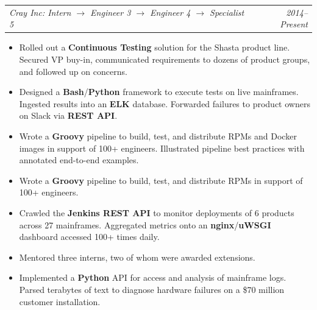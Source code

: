 \documentclass[12pt,letterpaper]{article}
\makeatletter
\newcommand{\headerpair}[2]{
    \begin{tabular*}{\linewidth}{l@{ \extracolsep{\fill} }r} {\large\emph{#1}} & {\large\emph{#2}}
    \end{tabular*}
}
\newcommand{\headerrow}[3]{\headerpair{#2: #1}{#3}}
\makeatother
\begin{document}
\headerrow
    {Intern $\to$ Engineer 3 $\to$ Engineer 4 $\to$ Specialist 5}
    {Cray Inc}
    {2014--Present}
\begin{itemize}
    \item Rolled out a \textbf{Continuous Testing} solution for the Shasta product line. Secured VP buy-in, communicated requirements to dozens of product groups, and followed up on concerns.
    \item Designed a \textbf{Bash}/\textbf{Python} framework to execute tests on live mainframes. Ingested results into an \textbf{ELK} database. Forwarded failures to product owners on Slack via \textbf{REST API}.
    \item Wrote a \textbf{Groovy} pipeline to build, test, and distribute RPMs and Docker images in support of 100+ engineers. Illustrated pipeline best practices with annotated end-to-end examples.
    \item Wrote a \textbf{Groovy} pipeline to build, test, and distribute RPMs in support of 100+ engineers.
    \item Crawled the \textbf{Jenkins REST API} to monitor deployments of 6 products across 27 mainframes. Aggregated metrics onto an \textbf{nginx}/\textbf{uWSGI} dashboard accessed 100+ times daily.
    \item Mentored three interns, two of whom were awarded extensions.
    \item Implemented a \textbf{Python} API for access and analysis of mainframe logs. Parsed terabytes of text to diagnose hardware failures on a \$70 million customer installation.










\end{itemize}
\end{document}
